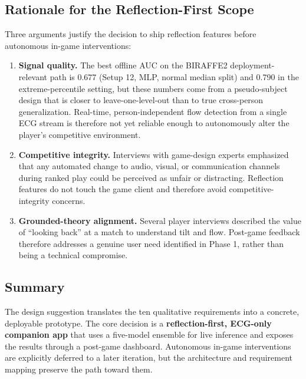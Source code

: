 \subsection{Rationale for the Reflection-First Scope}

Three arguments justify the decision to ship reflection features before autonomous in-game interventions:

\begin{enumerate}
    \item \textbf{Signal quality.} The best offline AUC on the BIRAFFE2 deployment-relevant path is 0.677 (Setup 12, MLP, normal median split) and 0.790 in the extreme-percentile setting, but these numbers come from a pseudo-subject design that is closer to leave-one-level-out than to true cross-person generalization. Real-time, person-independent flow detection from a single ECG stream is therefore not yet reliable enough to autonomously alter the player's competitive environment.
    \item \textbf{Competitive integrity.} Interviews with game-design experts emphasized that any automated change to audio, visual, or communication channels during ranked play could be perceived as unfair or distracting. Reflection features do not touch the game client and therefore avoid competitive-integrity concerns.
    \item \textbf{Grounded-theory alignment.} Several player interviews described the value of \enquote{looking back} at a match to understand tilt and flow. Post-game feedback therefore addresses a genuine user need identified in Phase 1, rather than being a technical compromise.
\end{enumerate}

\subsection{Summary}

The design suggestion translates the ten qualitative requirements into a concrete, deployable prototype. The core decision is a \textbf{reflection-first, ECG-only companion app} that uses a five-model ensemble for live inference and exposes the results through a post-game dashboard. Autonomous in-game interventions are explicitly deferred to a later iteration, but the architecture and requirement mapping preserve the path toward them.
